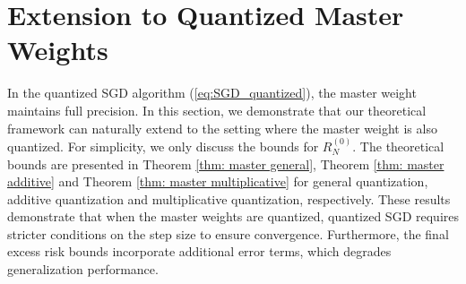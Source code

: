 \documentclass[11pt, letterpaper]{article}
\begin{document}
\section{Extension to Quantized Master Weights}
\label{sec: master weight}
In the quantized SGD algorithm (\ref{eq:SGD_quantized}), the master weight maintains full precision. In this section, we demonstrate that our theoretical framework can naturally extend to the setting where the master weight is also quantized. For simplicity, we only discuss the bounds for $R_N^{(0)}$. The theoretical bounds are presented in Theorem \ref{thm: master general}, Theorem \ref{thm: master additive} and Theorem \ref{thm: master multiplicative} for general quantization, additive quantization and multiplicative quantization, respectively. These results demonstrate that when the master weights are quantized, quantized SGD requires stricter conditions on the step size to ensure convergence. Furthermore, the final excess risk bounds incorporate additional error terms, which degrades generalization performance.
\end{document}
